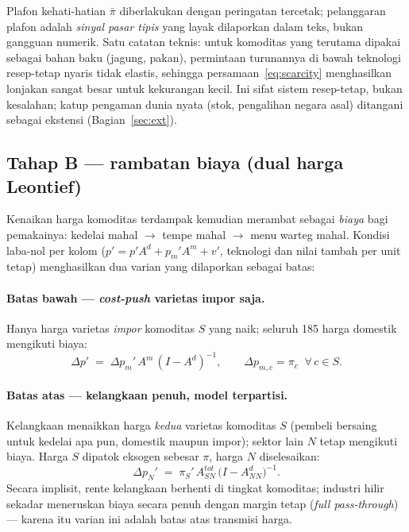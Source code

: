\documentclass[11pt,a4paper]{article}
\newcommand{\en}[1]{\textit{#1}}   %
\begin{document}
Plafon kehati-hatian $\bar\pi$ diberlakukan dengan peringatan tercetak;
pelanggaran plafon adalah \emph{sinyal pasar tipis} yang layak dilaporkan
dalam teks, bukan gangguan numerik. Satu catatan teknis: untuk komoditas
yang terutama dipakai sebagai bahan baku (jagung, pakan), permintaan
turunannya di bawah teknologi resep-tetap nyaris tidak elastis, sehingga
persamaan~\eqref{eq:scarcity} menghasilkan lonjakan sangat besar untuk
kekurangan kecil. Ini sifat sistem resep-tetap, bukan kesalahan; katup
pengaman dunia nyata (stok, pengalihan negara asal) ditangani sebagai
ekstensi (Bagian~\ref{sec:ext}).

\subsection{Tahap B --- rambatan biaya (dual harga Leontief)}

Kenaikan harga komoditas terdampak kemudian merambat sebagai \emph{biaya}
bagi pemakainya: kedelai mahal $\to$ tempe mahal $\to$ menu warteg mahal.
Kondisi laba-nol per kolom ($p' = p'A^d + p_m'A^m + v'$, teknologi dan
nilai tambah per unit tetap) menghasilkan dua varian yang dilaporkan
sebagai batas:

\paragraph{Batas bawah --- \en{cost-push} varietas impor saja.} Hanya
harga varietas \emph{impor} komoditas $S$ yang naik; seluruh 185 harga
domestik mengikuti biaya:
\begin{equation}
\Delta p' \;=\; \Delta p_m' \, A^m \, (I - A^d)^{-1},
\qquad \Delta p_{m,c} = \pi_c \;\; \forall\, c \in S .
\end{equation}

\paragraph{Batas atas --- kelangkaan penuh, model terpartisi.} Kelangkaan
menaikkan harga \emph{kedua} varietas komoditas $S$ (pembeli bersaing
untuk kedelai apa pun, domestik maupun impor); sektor lain $N$ tetap
mengikuti biaya. Harga $S$ dipatok eksogen sebesar $\pi$, harga $N$
diselesaikan:
\begin{equation}
\Delta p_N' \;=\; \pi_S' \, A^{tot}_{SN} \,
\bigl(I - A^{d}_{NN}\bigr)^{-1}.
\label{eq:partition}
\end{equation}
Secara implisit, rente kelangkaan berhenti di tingkat komoditas; industri
hilir sekadar meneruskan biaya secara penuh dengan margin tetap
(\en{full pass-through}) --- karena itu varian ini adalah batas atas
transmisi harga.
\end{document}
